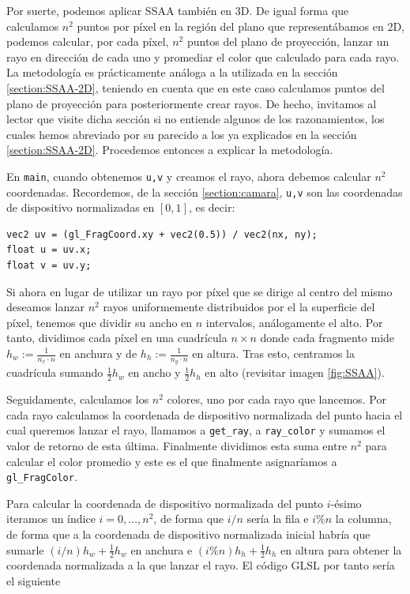 Por suerte, podemos aplicar SSAA también en 3D. De igual forma que calculamos $n^2$ puntos por píxel en la región del plano que representábamos en 2D, podemos calcular, por cada píxel, $n^2$ puntos del plano de proyección, lanzar un rayo en dirección de cada uno y promediar el color que calculado para cada rayo. La metodología es prácticamente análoga a la utilizada en la sección \ref{section:SSAA-2D}, teniendo en cuenta que en este caso calculamos puntos del plano de proyección para posteriormente crear rayos. De hecho, invitamos al lector que visite dicha sección si no entiende algunos de los razonamientos, los cuales hemos abreviado por su parecido a los ya explicados en la sección \ref{section:SSAA-2D}. Procedemos entonces a explicar la metodología.


En \verb|main|, cuando obtenemos \verb|u,v| y creamos el rayo, ahora debemos calcular $n^2$ coordenadas. Recordemos, de la sección \ref{section:camara}, \verb|u,v| son las coordenadas de dispositivo normalizadas en $[0,1]$, es decir:
\begin{lstlisting}
vec2 uv = (gl_FragCoord.xy + vec2(0.5)) / vec2(nx, ny);
float u = uv.x;
float v = uv.y;
\end{lstlisting}

Si ahora en lugar de utilizar un rayo por píxel que se dirige al centro del mismo deseamos lanzar $n^2$ rayos uniformemente distribuidos por el la superficie del píxel, tenemos que dividir su ancho en $n$ intervalos, análogamente el alto. Por tanto, dividimos cada píxel en una cuadrícula $n\times n$ donde cada fragmento mide $h_w:=\frac{1}{n_x\cdot n}$ en anchura y de $h_h:=\frac{1}{n_y \cdot n}$ en altura. Tras esto, centramos la cuadrícula sumando $\frac{1}{2}h_w$ en ancho y $\frac{1}{2}h_h$ en alto (revisitar imagen \ref{fig:SSAA}).

Seguidamente, calculamos los $n^2$ colores, uno por cada rayo que lancemos. Por cada rayo calculamos la coordenada de dispositivo normalizada del punto hacia el cual queremos lanzar el rayo, llamamos a \verb|get_ray|, a \verb|ray_color| y sumamos el valor de retorno de esta última. Finalmente dividimos esta suma entre $n^2$ para calcular el color promedio y este es el que finalmente asignaríamos a \verb|gl_FragColor|.

Para calcular la coordenada de dispositivo normalizada del punto $i$-ésimo iteramos un índice $i=0,\dots,n^2$, de forma que $i/n$ sería la fila e $i\%n$ la columna, de forma que a la coordenada de dispositivo normalizada inicial habría que sumarle $(i/n)h_w + \frac{1}{2}h_w$ en anchura e $(i\%n)h_h+ \frac{1}{2}h_h$ en altura para obtener la coordenada normalizada a la que lanzar el rayo. El código GLSL por tanto sería el siguiente

